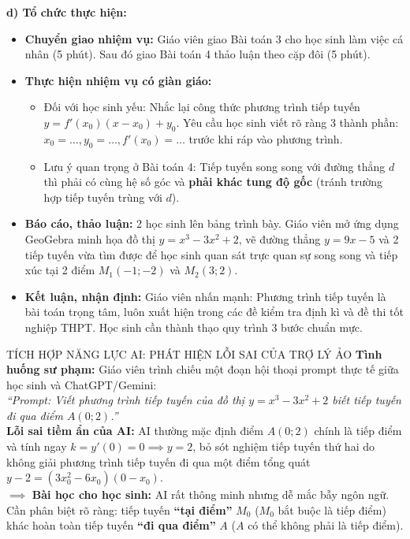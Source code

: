 \documentclass[12pt, a4paper]{article}
\begin{document}
\noindent \textbf{d) Tổ chức thực hiện:}
\begin{itemize}[leftmargin=0.6cm]
    \item \textbf{Chuyển giao nhiệm vụ:} Giáo viên giao Bài toán 3 cho học sinh làm việc cá nhân (5 phút). Sau đó giao Bài toán 4 thảo luận theo cặp đôi (5 phút).
    \item \textbf{Thực hiện nhiệm vụ có giàn giáo:}
    \begin{itemize}
        \item Đối với học sinh yếu: Nhắc lại công thức phương trình tiếp tuyến $y = f'(x_0)(x - x_0) + y_0$. Yêu cầu học sinh viết rõ ràng 3 thành phần: $x_0 = \dots, y_0 = \dots, f'(x_0) = \dots$ trước khi ráp vào phương trình.
        \item Lưu ý quan trọng ở Bài toán 4: Tiếp tuyến song song với đường thẳng $d$ thì phải có cùng hệ số góc và \textbf{phải khác tung độ gốc} (tránh trường hợp tiếp tuyến trùng với $d$).
    \end{itemize}
    \item \textbf{Báo cáo, thảo luận:} 2 học sinh lên bảng trình bày. Giáo viên mở ứng dụng GeoGebra minh họa đồ thị $y = x^3 - 3x^2 + 2$, vẽ đường thẳng $y = 9x - 5$ và 2 tiếp tuyến vừa tìm được để học sinh quan sát trực quan sự song song và tiếp xúc tại 2 điểm $M_1(-1; -2)$ và $M_2(3; 2)$.
    \item \textbf{Kết luận, nhận định:} Giáo viên nhấn mạnh: Phương trình tiếp tuyến là bài toán trọng tâm, luôn xuất hiện trong các đề kiểm tra định kì và đề thi tốt nghiệp THPT. Học sinh cần thành thạo quy trình 3 bước chuẩn mực.
\end{itemize}

\begin{aibox}{TÍCH HỢP NĂNG LỰC AI: PHÁT HIỆN LỖI SAI CỦA TRỢ LÝ ẢO}
\textbf{Tình huống sư phạm:} Giáo viên trình chiếu một đoạn hội thoại prompt thực tế giữa học sinh và ChatGPT/Gemini:\\
\textit{``Prompt: Viết phương trình tiếp tuyến của đồ thị $y = x^3 - 3x^2 + 2$ biết tiếp tuyến đi qua điểm $A(0; 2)$.''}\\
\textbf{Lỗi sai tiềm ẩn của AI:} AI thường mặc định điểm $A(0; 2)$ chính là tiếp điểm và tính ngay $k = y'(0) = 0 \implies y = 2$, bỏ sót nghiệm tiếp tuyến thứ hai do không giải phương trình tiếp tuyến đi qua một điểm tổng quát $y - 2 = (3x_0^2 - 6x_0)(0 - x_0)$.\\
$\implies$ \textbf{Bài học cho học sinh:} AI rất thông minh nhưng dễ mắc bẫy ngôn ngữ. Cần phân biệt rõ ràng: tiếp tuyến \textbf{``tại điểm''} $M_0$ ($M_0$ bắt buộc là tiếp điểm) khác hoàn toàn tiếp tuyến \textbf{``đi qua điểm''} $A$ ($A$ có thể không phải là tiếp điểm).
\end{aibox}
\end{document}
